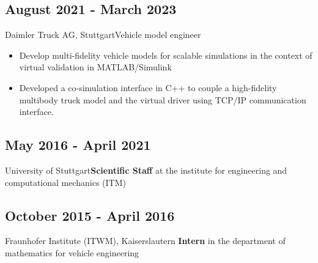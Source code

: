 \documentclass{mycv}
\begin{document}
\begin{paracol}{2}
{    \subsection{August 2021 - March 2023}{Daimler Truck AG, Stuttgart}{Vehicle model engineer}
          \begin{itemize}
              \item Develop multi-fidelity vehicle models for scalable simulations in the context of
          virtual validation in MATLAB/Simulink

            \item Developed a co-simulation interface in C++ to couple a high-fidelity
                multibody truck model and the virtual driver using
                TCP/IP communication interface.

          \end{itemize}

    \subsection{May 2016 - April 2021}{University of Stuttgart}{{\bfseries Scientific Staff} at the institute for engineering and
        computational \quad\quad mechanics (ITM)}

    \subsection{October 2015 - April 2016}{Fraunhofer Institute (ITWM), Kaiserslautern}
        {{\bfseries Intern} in the department of mathematics for vehicle engineering}\\
}
\end{paracol}
\end{document}
